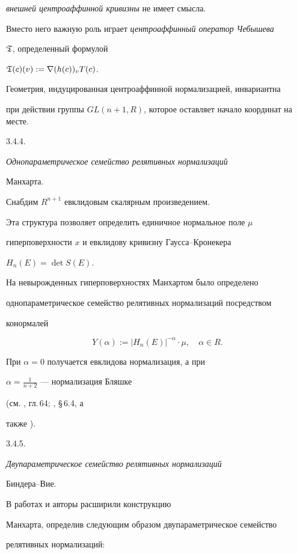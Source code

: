 {\it внешней центроаффинной кривизны} не имеет смысла.


Вместо него важную роль играет {\it центроаффинный оператор Чебышева}


$\frak{T}$, определенный формулой


$\frak{T}(c)(v) := \nabla (h(c))_v T(c)$.


Геометрия, индуцированная центроаффинной нормализацией, инвариантна


при действии группы $GL(n+1,R)$, которое оставляет начало координат на месте.


\smallskip





3.4.4. {\it Однопараметрическое семейство релятивных нормализаций


Манхарта.} Снабдим $R^{n+1}$ евклидовым скалярным произведением.


Эта структура позволяет определить единичное нормальное поле $\mu$


гиперповерхности $x$ и евклидову кривизну Гаусса--Кронекера


$H_n(E) = \det S(E)$.


На невырожденных гиперповерхностях Манхартом было определено


однопараметрическое семейство релятивных нормализаций посредством


конормалей


$$


Y(\alpha):= |H_n(E)|^{- \alpha} \cdot \mu, \quad


\alpha \in R.


$$


При $\alpha = 0$ получается евклидова нормализация, а при


$\alpha = \frac {1}{n+2}$ --- нормализация Бляшке


(см.  \cite{BLA}, гл.\,64;  \cite{SIM-S-V}, \S\,6.4, а


также \cite{WIE}).


\smallskip





3.4.5. {\it Двупараметрическое семейство релятивных нормализаций


Биндера--Вие.}


В работах \cite{WIE} и \cite{BIN-W} авторы расширили конструкцию


Манхарта, определив следующим образом двупараметрическое семейство


релятивных нормализаций:


